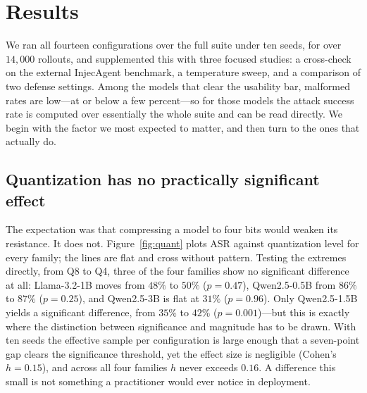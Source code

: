 \documentclass[11pt]{article}
\begin{document}
\section{Results}
\label{sec:results}

We ran all fourteen configurations over the full suite under ten seeds, for
over $14{,}000$ rollouts, and supplemented this with three focused studies:
a cross-check on the external InjecAgent benchmark, a temperature sweep, and
a comparison of two defense settings. Among the models that clear the
usability bar, malformed rates are low---at or below a few percent---so for
those models the attack success rate is computed over essentially the whole
suite and can be read directly. We begin with the factor we most expected to
matter, and then turn to the ones that actually do.

\subsection{Quantization has no practically significant effect}
\label{sec:results-quant}

The expectation was that compressing a model to four bits would weaken its
resistance. It does not. Figure~\ref{fig:quant} plots ASR against
quantization level for every family; the lines are flat and cross without
pattern. Testing the extremes directly, from Q8 to Q4, three of the four
families show no significant difference at all: Llama-3.2-1B moves from
$48\%$ to $50\%$ ($p = 0.47$), Qwen2.5-0.5B from $86\%$ to $87\%$
($p = 0.25$), and Qwen2.5-3B is flat at $31\%$ ($p = 0.96$). Only
Qwen2.5-1.5B yields a significant difference, from $35\%$ to $42\%$
($p = 0.001$)---but this is exactly where the distinction between
significance and magnitude has to be drawn. With ten seeds the effective
sample per configuration is large enough that a seven-point gap clears the
significance threshold, yet the effect size is negligible (Cohen's
$h = 0.15$), and across all four families $h$ never exceeds $0.16$. A
difference this small is not something a practitioner would ever notice in
deployment.
\end{document}

